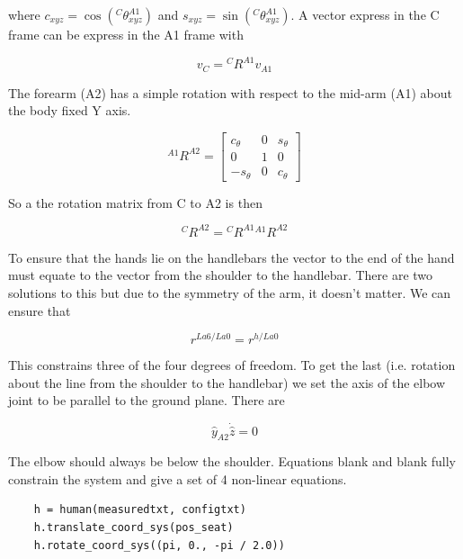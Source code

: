 \documentclass[10pt]{article}
\begin{document}
where \(c_{xyz}=\operatorname{cos}\left({}^C\theta^{A1}_{xyz}\right)\) and
\(s_{xyz}=\operatorname{sin}\left({}^C\theta^{A1}_{xyz}\right)\). A vector express in the C
frame can be express in the A1 frame with

\begin{equation}
	v_C={}^CR^{A1} v_{A1}
\end{equation}

The forearm (A2) has a simple rotation with respect to the mid-arm (A1) about
the body fixed Y axis.

\begin{equation}
  {}^{A1}R^{A2} =
  \begin{bmatrix}
    c_\theta & 0 & s_\theta\\
    0 & 1 & 0\\
    -s_\theta & 0 & c_\theta
  \end{bmatrix}
\end{equation}

So a the rotation matrix from C to A2 is then

\begin{equation}
	{}^CR^{A2} = {}^CR^{A1}{}^{A1}R^{A2}
\end{equation}

To ensure that the hands lie on the handlebars the vector to the end of the
hand must equate to the vector from the shoulder to the handlebar. There are
two solutions to this but due to the symmetry of the arm, it doesn't matter.
We can ensure that

\begin{equation}
	r^{La6/La0} = r^{h/La0}
\end{equation}

This constrains three of the four degrees of freedom. To get the last (i.e.
rotation about the line from the shoulder to the handlebar) we set the axis of
the elbow joint to be parallel to the ground plane. There are  

\begin{equation}
  \hat{y}_{A2}\dot\hat{z} = 0
\end{equation}

The elbow should always be below the shoulder. Equations blank and blank fully
constrain the system and give a set of 4 non-linear equations.

\begin{verbatim}
	h = human(measuredtxt, configtxt)
	h.translate_coord_sys(pos_seat)
	h.rotate_coord_sys((pi, 0., -pi / 2.0))
\end{verbatim}
\end{document}
